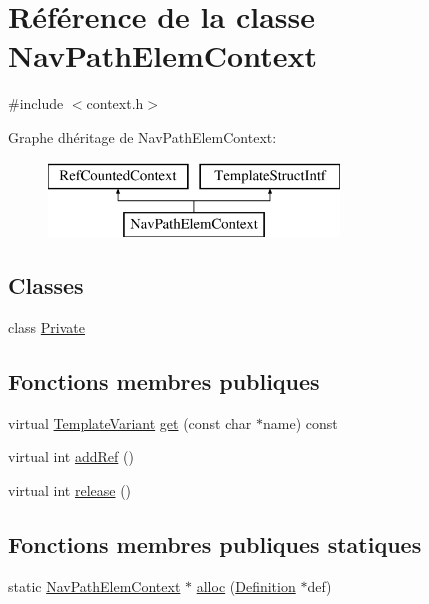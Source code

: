 \hypertarget{class_nav_path_elem_context}{}\section{Référence de la classe Nav\+Path\+Elem\+Context}
\label{class_nav_path_elem_context}


{\ttfamily \#include $<$context.\+h$>$}

Graphe d\textquotesingle{}héritage de Nav\+Path\+Elem\+Context\+:\begin{figure}[H]
\begin{center}
\leavevmode
\includegraphics[height=2.000000cm]{class_nav_path_elem_context}
\end{center}
\end{figure}
\subsection*{Classes}
\begin{DoxyCompactItemize}
\item 
class \hyperlink{class_nav_path_elem_context_1_1_private}{Private}
\end{DoxyCompactItemize}
\subsection*{Fonctions membres publiques}
\begin{DoxyCompactItemize}
\item 
virtual \hyperlink{class_template_variant}{Template\+Variant} \hyperlink{class_nav_path_elem_context_a84fc2fc6fe8d30d11f8cd11aec059808}{get} (const char $\ast$name) const 
\item 
virtual int \hyperlink{class_nav_path_elem_context_acb59dcbc239ee16b89c24a85ef2c5bce}{add\+Ref} ()
\item 
virtual int \hyperlink{class_nav_path_elem_context_af1e44c0b19b04c0b3ed51f955005a97e}{release} ()
\end{DoxyCompactItemize}
\subsection*{Fonctions membres publiques statiques}
\begin{DoxyCompactItemize}
\item 
static \hyperlink{class_nav_path_elem_context}{Nav\+Path\+Elem\+Context} $\ast$ \hyperlink{class_nav_path_elem_context_aa0132826a523f5e429474c084f2d6cbc}{alloc} (\hyperlink{class_definition}{Definition} $\ast$def)
\end{DoxyCompactItemize}


